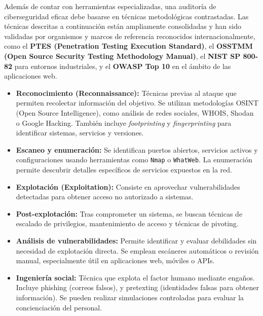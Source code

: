 \documentclass[a4paper, 10pt]{article}
\begin{document}
    Además de contar con herramientas especializadas, una auditoría de ciberseguridad eficaz debe basarse en técnicas metodológicas contrastadas. Las técnicas descritas a continuación están ampliamente consolidadas y han sido validadas por organismos y marcos de referencia reconocidos internacionalmente, como el \textbf{PTES (Penetration Testing Execution Standard)}, el \textbf{OSSTMM (Open Source Security Testing Methodology Manual)}, el \textbf{NIST SP 800-82} para entornos industriales, y el \textbf{OWASP Top 10} en el ámbito de las aplicaciones web.
    
    \begin{itemize}
      \item \textbf{Reconocimiento (Reconnaissance):} Técnicas previas al ataque que permiten recolectar información del objetivo. Se utilizan metodologías OSINT (Open Source Intelligence), como análisis de redes sociales, WHOIS, Shodan o Google Hacking. También incluye \textit{footprinting} y \textit{fingerprinting} para identificar sistemas, servicios y versiones.
    
      \item \textbf{Escaneo y enumeración:} Se identifican puertos abiertos, servicios activos y configuraciones usando herramientas como \texttt{Nmap} o \texttt{WhatWeb}. La enumeración permite descubrir detalles específicos de servicios expuestos en la red.
    
      \item \textbf{Explotación (Exploitation):} Consiste en aprovechar vulnerabilidades detectadas para obtener acceso no autorizado a sistemas.
    
      \item \textbf{Post-explotación:} Tras comprometer un sistema, se buscan técnicas de escalado de privilegios, mantenimiento de acceso y técnicas de pivoting.
    
      \item \textbf{Análisis de vulnerabilidades:} Permite identificar y evaluar debilidades sin necesidad de explotación directa. Se emplean escáneres automáticos o revisión manual, especialmente útil en aplicaciones web, móviles o APIs.
    
      \item \textbf{Ingeniería social:} Técnica que explota el factor humano mediante engaños. Incluye phishing (correos falsos), y pretexting (identidades falsas para obtener información). Se pueden realizar simulaciones controladas para evaluar la concienciación del personal. 
    

\end{itemize}
\end{document}
